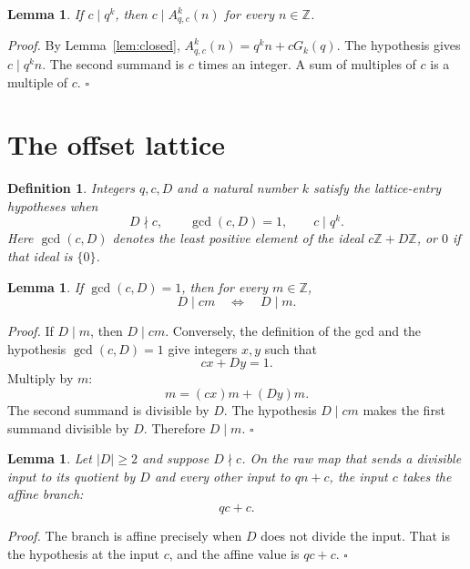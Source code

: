 \documentclass[11pt,letterpaper]{article}
\newcommand{\Z}{\mathbb{Z}}
\newtheorem{lemma}[theorem]{Lemma}
\newtheorem{definition}[theorem]{Definition}
\newenvironment{proof}{\noindent\textit{Proof.}}{\hfill\(\square\)}
\begin{document}
\begin{lemma}
\label{lem:power}
If \(c\mid q^k\), then \(c\mid A_{q,c}^{k}(n)\) for every \(n\in\Z\).
\end{lemma}

\begin{proof}
By Lemma~\ref{lem:closed}, \(A_{q,c}^{k}(n)=q^k n+cG_k(q)\). The hypothesis gives \(c\mid q^k n\). The second summand is \(c\) times an integer. A sum of multiples of \(c\) is a multiple of \(c\).
\end{proof}

\section{The offset lattice}

\begin{definition}
\label{def:hypotheses}
Integers \(q,c,D\) and a natural number \(k\) satisfy the lattice-entry hypotheses when
\[
D\nmid c,\qquad \gcd(c,D)=1,\qquad c\mid q^k.
\]
Here \(\gcd(c,D)\) denotes the least positive element of the ideal \(c\Z+D\Z\), or \(0\) if that ideal is \(\{0\}\).
\end{definition}

\begin{lemma}
\label{lem:transverse}
If \(\gcd(c,D)=1\), then for every \(m\in\Z\),
\[
D\mid cm\quad\Longleftrightarrow\quad D\mid m.
\]
\end{lemma}

\begin{proof}
If \(D\mid m\), then \(D\mid cm\). Conversely, the definition of the gcd and the hypothesis \(\gcd(c,D)=1\)
give integers \(x,y\) such that
\[
cx+Dy=1.
\]
Multiply by \(m\):
\[
m=(cx)m+(Dy)m.
\]
The second summand is divisible by \(D\). The hypothesis \(D\mid cm\) makes the first summand divisible by \(D\). Therefore \(D\mid m\).
\end{proof}

\begin{lemma}
\label{lem:offset-affine}
Let \(|D|\ge 2\) and suppose \(D\nmid c\). On the raw map that sends a divisible input to its quotient by \(D\) and every other input to \(qn+c\), the input \(c\) takes the affine branch:
\[
qc+c.
\]
\end{lemma}

\begin{proof}
The branch is affine precisely when \(D\) does not divide the input. That is the hypothesis at the input \(c\), and the affine value is \(qc+c\).
\end{proof}
\end{document}
